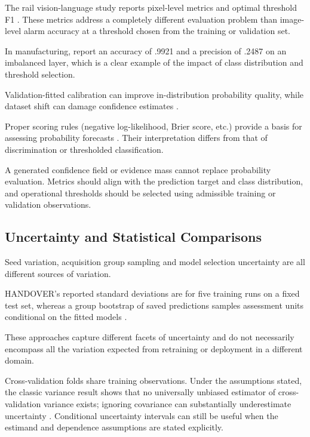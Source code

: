 The rail vision-language study reports pixel-level metrics and optimal threshold F1 \parencite[p.~7]{lei_dual-state-based_2025}. These metrics address a completely different evaluation problem than image-level alarm
accuracy at a threshold chosen from the training or validation set.

In manufacturing, \textcite{petrich_multi-modal_2021} report an accuracy of .9921 and a precision of .2487 on an
imbalanced layer, which is a clear example of the impact of class distribution and threshold
selection.

Validation-fitted calibration can improve in-distribution probability quality, while dataset shift
can damage confidence estimates \parencite{guo_calibration_2017,ovadia_can_2019}.

Proper scoring rules (negative log-likelihood, Brier score, etc.) provide a basis for assessing
probability forecasts \parencite{gneiting_strictly_2007}. Their interpretation differs from that of discrimination or
thresholded classification.

A generated confidence field or evidence mass cannot replace probability evaluation. Metrics should
align with the prediction target and class distribution, and operational thresholds should be
selected using admissible training or validation observations.

\subsection{Uncertainty and Statistical Comparisons}

Seed variation, acquisition group sampling and model selection uncertainty are all different sources
of variation.

HANDOVER's reported standard deviations are for five training runs on a fixed test set, whereas a
group bootstrap of saved predictions samples assessment units conditional on the fitted models
\parencite{thoduka_multimodal_2024}.

These approaches capture different facets of uncertainty and do not necessarily encompass all the
variation expected from retraining or deployment in a different domain.

Cross-validation folds share training observations. Under the assumptions stated, the classic
variance result shows that no universally unbiased estimator of cross-validation variance exists;
ignoring covariance can substantially underestimate uncertainty \parencite[pp.~1096--1098, 1102--1104]{bengio_no_2004}. Conditional uncertainty intervals can still be useful when the
estimand and dependence assumptions are stated explicitly.

